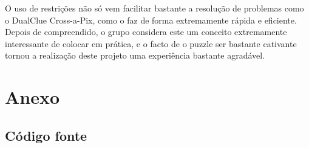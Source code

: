 \documentclass[runningheads,a4paper]{llncs}
\begin{document}
O uso de restrições não só vem facilitar bastante a resolução de problemas como o DualClue Cross-a-Pix, como o faz de forma extremamente rápida e eficiente. Depois de compreendido, o grupo considera este um conceito extremamente interessante de colocar em prática, e o facto de o puzzle ser bastante cativante tornou a realização deste projeto uma experiência bastante agradável. 

\section*{Anexo}

\subsection*{Código fonte}

\end{document}
